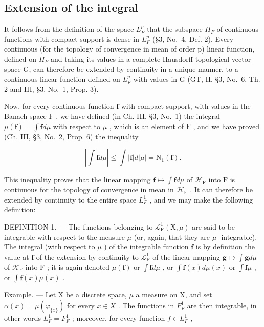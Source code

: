 \subsection{Extension of the integral}

It follows from the definition of the space \(L_{F}^{p}\) that the subspace \(H_{F}\) of continuous functions with compact support is dense in \(L_{F}^{p}\) (§3, No.~4, Def. 2). Every continuous (for the topology of convergence in mean of order p) linear function, defined on \(H_{F}\) and taking its values in a complete Hausdorff topological vector space G, can therefore be extended by continuity in a unique manner, to a continuous linear function defined on \(L_{F}^{p}\) with values in G (GT, II, §3, No.~6, Th. 2 and III, §3, No.~1, Prop. 3).

Now, for every continuous function \(\mathbf{f}\) with compact support, with values in the Banach space \(\mathrm{F}\) , we have defined (in Ch. III, §3, No.~1) the integral \(\mu(\mathbf{f}) = \int \mathbf{f} d\mu\) with respect to \(\mu\) , which is an element of \(\mathrm{F}\) , and we have proved (Ch. III, §3, No.~2, Prop. 6) the inequality

\[
\left| \int \mathbf {f} d \mu \right| \leqslant \int | \mathbf {f} | d | \mu | = \mathrm{N} _ {1} (\mathbf {f}).\tag{1}
\]

This inequality proves that the linear mapping \(\mathbf{f} \mapsto \int \mathbf{f} d\mu\) of \(\mathcal{H}_{\mathrm{F}}\) into \(\mathrm{F}\) is continuous for the topology of convergence in mean in \(\mathcal{H}_{\mathrm{F}}\) . It can therefore be extended by continuity to the entire space \(L_{F}^{1}\) , and we may make the following definition:

DEFINITION 1. --- The functions belonging to \(\mathcal{L}_{\mathrm{F}}^{1}(\mathrm{X},\mu)\) are said to be integrable with respect to the measure \(\mu\) (or, again, that they are \(\mu\) -integrable). The integral (with respect to \(\mu\) ) of the integrable function \(\mathbf{f}\) is by definition the value at \(\mathbf{f}\) of the extension by continuity to \(\mathcal{L}_{\mathrm{F}}^{1}\) of the linear mapping \(\mathbf{g} \mapsto \int \mathbf{g} d\mu\) of \(\mathcal{K}_{\mathrm{F}}\) into \(\mathrm{F}\) ; it is again denoted \(\mu(\mathbf{f})\) or \(\int \mathbf{f} d\mu\) , or \(\int \mathbf{f}(x) d\mu(x)\) or \(\int \mathbf{f}\mu\) , or \(\int \mathbf{f}(x)\mu(x)\) .

Example. --- Let X be a discrete space, \(\mu\) a measure on X, and set \(\alpha(x) = \mu(\varphi_{\{x\}})\) for every \(x \in X\) . The functions in \(F_{F}^{1}\) are then integrable, in other words \(L_{F}^{1} = F_{F}^{1}\) ; moreover, for every function \(f \in L_{F}^{1}\) ,

